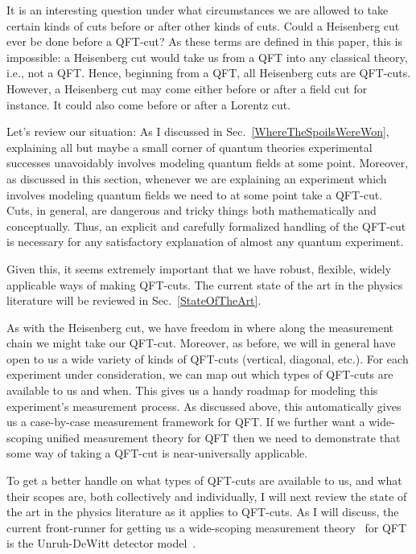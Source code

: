 \documentclass[12pt,prd,superscriptaddress,floatfix,amsmath,amssymb,amsfonts,nofootinbib]{revtex4-2}
\begin{document}
It is an interesting question under what circumstances we are allowed to take certain kinds of cuts before or after other kinds of cuts. Could a Heisenberg cut ever be done before a QFT-cut? As these terms are defined in this paper, this is impossible: a Heisenberg cut would take us from a QFT into any classical theory, i.e., not a QFT. Hence, beginning from a QFT, all Heisenberg cuts are QFT-cuts. However, a Heisenberg cut may come either before or after a field cut for instance. It could also come before or after a Lorentz cut. 

Let's review our situation: As I discussed in Sec.~\ref{WhereTheSpoilsWereWon}, explaining all but maybe a small corner of quantum theories experimental successes unavoidably involves modeling quantum fields at some point. Moreover, as discussed in this section, whenever we are explaining an experiment which involves modeling quantum fields we need to at some point take a QFT-cut. Cuts, in general, are dangerous and tricky things both mathematically and conceptually. Thus, an explicit and carefully formalized handling of the QFT-cut is necessary for any satisfactory explanation of almost any quantum experiment. 

Given this, it seems extremely important that we have robust, flexible, widely applicable ways of making QFT-cuts. The current state of the art in the physics literature will be reviewed in Sec.~\ref{StateOfTheArt}.

As with the Heisenberg cut, we have freedom in where along the measurement chain we might take our QFT-cut. Moreover, as before, we will in general have open to us a wide variety of kinds of QFT-cuts (vertical, diagonal, etc.). For each experiment under consideration, we can map out which types of QFT-cuts are available to us and when. This gives us a handy roadmap for modeling this experiment's measurement process. As discussed above, this automatically gives us a case-by-case measurement framework for QFT. If we further want a wide-scoping unified measurement theory for QFT then we need to demonstrate that some way of taking a QFT-cut is near-universally applicable.

To get a better handle on what types of QFT-cuts are available to us, and what their scopes are, both collectively and individually, I will next review the state of the art in the physics literature as it applies to QFT-cuts. As I will discuss, the current front-runner for getting us a wide-scoping measurement theory~\cite{pologomez2021detectorbased} for QFT is the Unruh-DeWitt detector model~\cite{Unruh1976,BLHu2007, Brown2013, Hotta2020, Zeromode,TaleOfTwo,Adam,Valentini1991, Reznik2003, Pozas-Kerstjens:2015,Menicucci, Terno2016, Cosmo, Henderson2018}.
\end{document}
